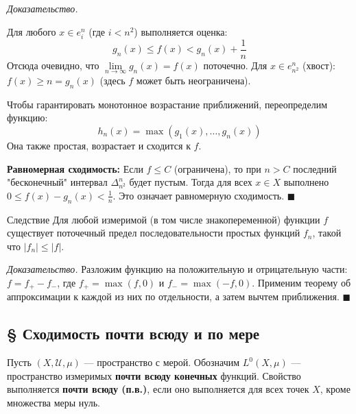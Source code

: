 \documentclass[12pt,a4paper]{article}
\newenvironment{Proof}[1][Доказательство]{\vspace{0.5em}\noindent\textit{#1.}\hspace{0.5em}\ignorespaces}{\hfill$\blacksquare$\vspace{1em}}
\begin{document}
\begin{Proof}
\begin{center}
\end{center}

Для любого $x \in e_i^n$ (где $i < n^2$) выполняется оценка:
$$ g_n(x) \le f(x) < g_n(x) + \frac{1}{n} $$
Отсюда очевидно, что $\lim\limits_{n \to \infty} g_n(x) = f(x)$ поточечно. 
Для $x \in e_{n^2}^n$ (хвост): $f(x) \ge n = g_n(x)$ (здесь $f$ может быть неограничена).

Чтобы гарантировать монотонное возрастание приближений, переопределим функцию: 
$$ h_n(x) = \max(g_1(x), \dots, g_n(x)) $$
Она также простая, возрастает и сходится к $f$.

\textbf{Равномерная сходимость:} Если $f \le C$ (ограничена), то при $n > C$ последний "бесконечный" интервал $\Delta_{n^2}^n$ будет пустым. Тогда для всех $x \in X$ выполнено $0 \le f(x) - g_n(x) < \frac{1}{n}$. Это означает равномерную сходимость.
\end{Proof}

\begin{Theorem}{Следствие}{}
Для любой измеримой (в том числе знакопеременной) функции $f$ существует поточечный предел последовательности простых функций $f_n$, такой что $|f_n| \le |f|$.
\end{Theorem}

\begin{Proof}
Разложим функцию на положительную и отрицательную части: $f = f_+ - f_-$, где $f_+ = \max(f, 0)$ и $f_- = \max(-f, 0)$. Применим теорему об аппроксимации к каждой из них по отдельности, а затем вычтем приближения.
\end{Proof}

\subsection{§ Сходимость почти всюду и по мере}

Пусть $(X, \mathcal{U}, \mu)$ — пространство с мерой.
Обозначим $L^0(X, \mu)$ — пространство измеримых \textbf{почти всюду конечных} функций.
Свойство выполняется \textbf{почти всюду (п.в.)}, если оно выполняется для всех точек $X$, кроме множества меры нуль.
\end{document}
